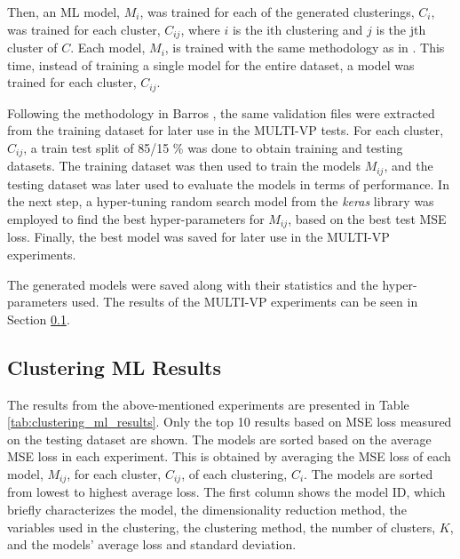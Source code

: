 Then, an ML model, $M_i$, was trained for each of the generated clusterings, $C_i$, was trained for each cluster, $C_{ij}$, where $i$ is the ith clustering and $j$ is the jth cluster of $C$. Each model, $M_i$, is trained with the same methodology as in \cite{barros_InitialConditionEstimation_}. This time, instead of training a single model for the entire dataset, a model was trained for each cluster, $C_{ij}$. 

Following the methodology in Barros \cite{barros_InitialConditionEstimation_}, the same validation files were extracted from the training dataset for later use in the MULTI-VP tests. For each cluster, $C_{ij}$, a train test split of 85/15 \% was done to obtain training and testing datasets. The training dataset was then used to train the models $M_{ij}$, and the testing dataset was later used to evaluate the models in terms of performance. In the next step, a hyper-tuning random search model from the \textit{keras} \cite{chollet2015keras} library was employed to find the best hyper-parameters for $M_{ij}$, based on the best test MSE loss. Finally, the best model was saved for later use in the MULTI-VP experiments. 

The generated models were saved along with their statistics and the hyper-parameters used. The results of the MULTI-VP experiments can be seen in Section \ref{sec:clustering_ml_results}.

\subsection{Clustering ML Results}\label{sec:clustering_ml_results}
The results from the above-mentioned experiments are presented in Table \ref{tab:clustering_ml_results}. Only the top 10 results based on MSE loss measured on the testing dataset are shown. The models are sorted based on the average MSE loss in each experiment. This is obtained by averaging the MSE loss of each model, $M_{ij}$, for each cluster, $C_{ij}$, of each clustering, $C_i$. The models are sorted from lowest to highest average loss. The first column shows the model ID, which briefly characterizes the model, the dimensionality reduction method, the variables used in the clustering, the clustering method, the number of clusters, $K$, and the models' average loss and standard deviation.



